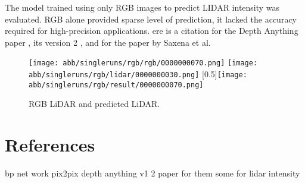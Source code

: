 The model trained using only RGB images to predict LIDAR intensity was evaluated. RGB alone provided sparse level of prediction, it lacked the accuracy required for high-precision applications. ere is a citation for the Depth Anything paper \cite{depthanything}, its version 2 \cite{depth_anything_v2}, and for the paper by Saxena et al. \cite{saxena2008depth}
\begin{figure}[!ht]
	\centering
	\texttt{[image: abb/singleruns/rgb/rgb/0000000070.png]}
	\texttt{[image: abb/singleruns/rgb/lidar/0000000030.png]}
	\scalebox{2}[0.5]{\texttt{[image: abb/singleruns/rgb/result/0000000070.png]}}
	\caption{RGB LiDAR and predicted LiDAR.}
	\label{rgb}
\end{figure}


\section{References}
bp net work
pix2pix
depth anything v1 2
paper for them 
some for lidar intensity
